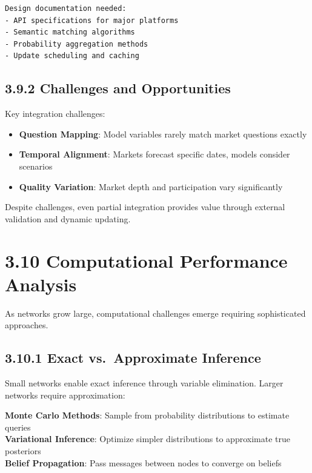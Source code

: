 \documentclass[
  11pt,
  letterpaper,
]{book}
\providecommand{\tightlist}{%
  \setlength{\itemsep}{0pt}\setlength{\parskip}{0pt}}
\begin{document}
\begin{verbatim}
Design documentation needed:
- API specifications for major platforms
- Semantic matching algorithms
- Probability aggregation methods
- Update scheduling and caching
\end{verbatim}

\subsection*{3.9.2 Challenges and
Opportunities}\label{sec-market-challenges}

Key integration challenges:

\begin{itemize}
\tightlist
\item
  \textbf{Question Mapping}: Model variables rarely match market
  questions exactly
\item
  \textbf{Temporal Alignment}: Markets forecast specific dates, models
  consider scenarios
\item
  \textbf{Quality Variation}: Market depth and participation vary
  significantly
\end{itemize}

Despite challenges, even partial integration provides value through
external validation and dynamic updating.

\section*{3.10 Computational Performance
Analysis}\label{sec-computational-performance}


As networks grow large, computational challenges emerge requiring
sophisticated approaches.

\subsection*{3.10.1 Exact vs.~Approximate
Inference}\label{sec-exact-approximate}

Small networks enable exact inference through variable elimination.
Larger networks require approximation:

\textbf{Monte Carlo Methods}: Sample from probability distributions to
estimate queries\\
\textbf{Variational Inference}: Optimize simpler distributions to
approximate true posteriors\\
\textbf{Belief Propagation}: Pass messages between nodes to converge on
beliefs
\end{document}
